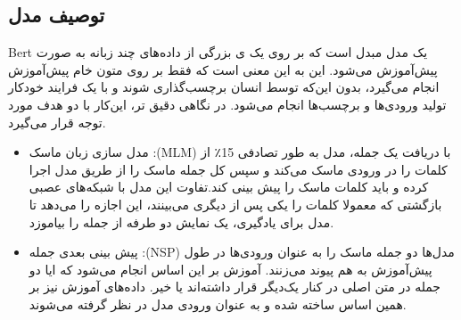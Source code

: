 \subsection{توصیف مدل}
Bert یک مدل مبدل است که بر روی یک
ی
بزرگی از داده‌های چند زبانه
به صورت
پیش‌آموزش می‌شود.
این به این معنی است که فقط بر روی متون خام پیش‌آموزش انجام می‌گیرد، بدون این‌که  توسط انسان برچسب‌گذاری شوند و با یک فرایند خودکار تولید ورودی‌ها و برچسب‌ها انجام می‌شود.
در نگاهی 
دقیق تر، این‌کار با دو هدف مورد توجه قرار می‌گیرد.

\begin{itemize}
\item مدل سازی زبان ماسک :(MLM) با دریافت یک جمله، مدل به طور تصادفی 15٪ از کلمات را در ورودی ماسک می‌کند و سپس کل جمله ماسک را از طریق مدل اجرا کرده و باید کلمات ماسک را پیش بینی کند.تفاوت این مدل با شبکه‌های عصبی بازگشتی که معمولا کلمات را یکی پس از دیگری می‌بینند، این اجازه را می‌دهد تا مدل برای یادگیری، یک نمایش دو طرفه از جمله را بیاموزد.
\item پیش بینی بعدی جمله :(NSP) مدل‌ها دو جمله ماسک را به عنوان ورودی‌ها در طول پیش‌آموزش به هم پیوند می‌زنند. آموزش بر این اساس انجام می‌شود که ایا دو جمله در متن اصلی در کنار یک‌دیگر قرار داشته‌اند یا خیر. داده‌های آموزش نیز بر همین اساس ساخته شده و به عنوان ورودی مدل در نظر گرفته می‌شوند.
\end{itemize}

